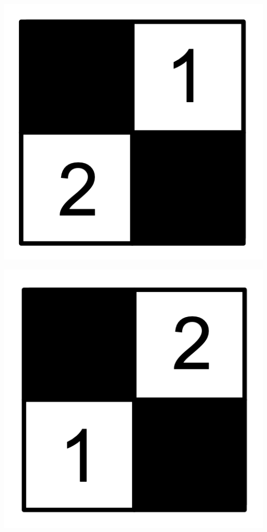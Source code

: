 \documentclass{book}
\theoremstyle{definition}
\begin{document}
\begin{center}
\includegraphics[scale=1]{r3.png}
\end{center}

\begin{center}
\includegraphics[scale=1]{r4.png}
\end{center}
\end{document}
